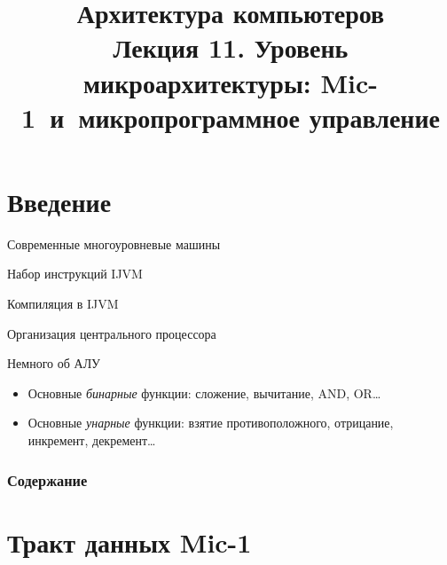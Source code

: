 \newcommand{\h}{%
handout,%
}



\title[Уровень микроархитектуры и Mic-1]{Архитектура компьютеров\texorpdfstring{\\}{ }Лекция 11. Уровень микроархитектуры:
Mic-1~и~микропрограммное управление}



\begin{frame}
\titlepage
\end{frame}

\section{Введение}

\begin{frame}{Современные многоуровневые машины}
\center

\end{frame}

\begin{frame}{Набор инструкций IJVM}
\end{frame}

\begin{frame}{Компиляция в IJVM}
\end{frame}

\begin{frame}{Организация центрального процессора}
\end{frame}

\begin{frame}{Немного об АЛУ}

\pause
\begin{itemize}
  \item Основные \emph{бинарные} функции: сложение, вычитание, AND, OR…
  \item Основные \emph{унарные} функции: взятие противоположного,
  отрицание, инкремент, декремент… %
\end{itemize}

\end{frame}

\begin{frame}
\frametitle{Содержание}
\tableofcontents
\end{frame}

\section{Тракт данных Mic-1}

